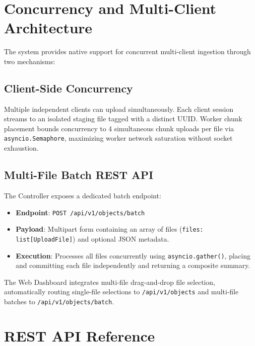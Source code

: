 \documentclass[11pt,a4paper]{article}
\begin{document}
\section{Concurrency and Multi-Client Architecture}
\label{sec:concurrency}

The system provides native support for concurrent multi-client ingestion through two mechanisms:

\subsection{Client-Side Concurrency}
Multiple independent clients can upload simultaneously. Each client session streams to an isolated staging file tagged with a distinct UUID. Worker chunk placement bounds concurrency to 4 simultaneous chunk uploads per file via \texttt{asyncio.Semaphore}, maximizing worker network saturation without socket exhaustion.

\subsection{Multi-File Batch REST API}
The Controller exposes a dedicated batch endpoint:
\begin{itemize}[noitemsep]
    \item \textbf{Endpoint}: \texttt{POST /api/v1/objects/batch}
    \item \textbf{Payload}: Multipart form containing an array of files (\texttt{files: list[UploadFile]}) and optional JSON metadata.
    \item \textbf{Execution}: Processes all files concurrently using \texttt{asyncio.gather()}, placing and committing each file independently and returning a composite summary.
\end{itemize}

The Web Dashboard integrates multi-file drag-and-drop file selection, automatically routing single-file selections to \texttt{/api/v1/objects} and multi-file batches to \texttt{/api/v1/objects/batch}.

\section{REST API Reference}
\label{sec:api}
\end{document}
